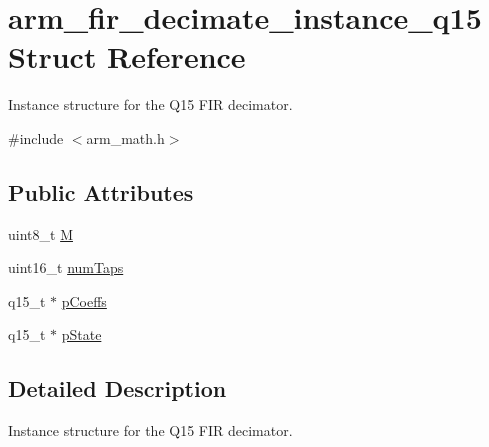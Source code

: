 \hypertarget{structarm__fir__decimate__instance__q15}{\section{arm\-\_\-fir\-\_\-decimate\-\_\-instance\-\_\-q15 Struct Reference}
\label{structarm__fir__decimate__instance__q15}
}


Instance structure for the Q15 F\-I\-R decimator.  




{\ttfamily \#include $<$arm\-\_\-math.\-h$>$}

\subsection*{Public Attributes}
\begin{DoxyCompactItemize}
\item 
uint8\-\_\-t \hyperlink{structarm__fir__decimate__instance__q15_aad9320284218b3aa378527ea518cf093}{M}
\item 
uint16\-\_\-t \hyperlink{structarm__fir__decimate__instance__q15_ac1e9844488ec717da334fbd4c4f41990}{num\-Taps}
\item 
q15\-\_\-t $\ast$ \hyperlink{structarm__fir__decimate__instance__q15_a01cacab67e73945e8289075598ede14d}{p\-Coeffs}
\item 
q15\-\_\-t $\ast$ \hyperlink{structarm__fir__decimate__instance__q15_a3f7b5184bb28853ef401b001df121047}{p\-State}
\end{DoxyCompactItemize}


\subsection{Detailed Description}
Instance structure for the Q15 F\-I\-R decimator. 

